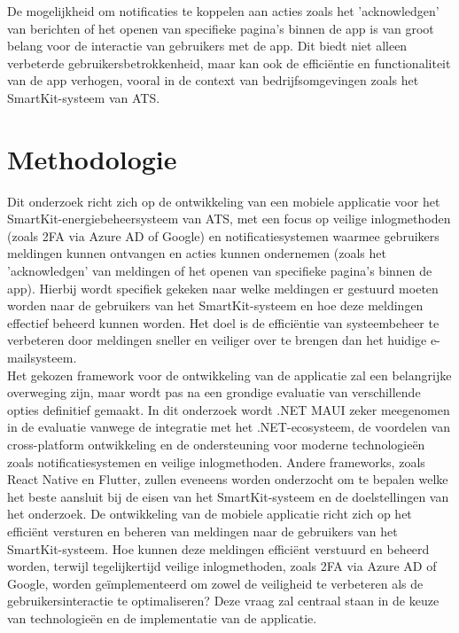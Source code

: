 \noindent De mogelijkheid om notificaties te koppelen aan acties zoals het 'acknowledgen' van berichten of het openen van specifieke pagina's binnen de app is van groot belang voor de interactie van gebruikers met de app. Dit biedt niet alleen verbeterde gebruikersbetrokkenheid, maar kan ook de efficiëntie en functionaliteit van de app verhogen, vooral in de context van bedrijfsomgevingen zoals het SmartKit-systeem van ATS.



\section{Methodologie}
\label{sec:methodologie}

\noindent Dit onderzoek richt zich op de ontwikkeling van een mobiele applicatie voor het SmartKit-energiebeheersysteem van ATS, met een focus op veilige inlogmethoden (zoals 2FA via Azure AD of Google) en notificatiesystemen waarmee gebruikers meldingen kunnen ontvangen en acties kunnen ondernemen (zoals het 'acknowledgen' van meldingen of het openen van specifieke pagina's binnen de app). Hierbij wordt specifiek gekeken naar welke meldingen er gestuurd moeten worden naar de gebruikers van het SmartKit-systeem en hoe deze meldingen effectief beheerd kunnen worden. Het doel is de efficiëntie van systeembeheer te verbeteren door meldingen sneller en veiliger over te brengen dan het huidige e-mailsysteem. \\

\noindent Het gekozen framework voor de ontwikkeling van de applicatie zal een belangrijke overweging zijn, maar wordt pas na een grondige evaluatie van verschillende opties definitief gemaakt. In dit onderzoek wordt .NET MAUI zeker meegenomen in de evaluatie vanwege de integratie met het .NET-ecosysteem, de voordelen van cross-platform ontwikkeling en de ondersteuning voor moderne technologieën zoals notificatiesystemen en veilige inlogmethoden. Andere frameworks, zoals React Native en Flutter, zullen eveneens worden onderzocht om te bepalen welke het beste aansluit bij de eisen van het SmartKit-systeem en de doelstellingen van het onderzoek. De ontwikkeling van de mobiele applicatie richt zich op het efficiënt versturen en beheren van meldingen naar de gebruikers van het SmartKit-systeem. Hoe kunnen deze meldingen efficiënt verstuurd en beheerd worden, terwijl tegelijkertijd veilige inlogmethoden, zoals 2FA via Azure AD of Google, worden geïmplementeerd om zowel de veiligheid te verbeteren als de gebruikersinteractie te optimaliseren? Deze vraag zal centraal staan in de keuze van technologieën en de implementatie van de applicatie.

